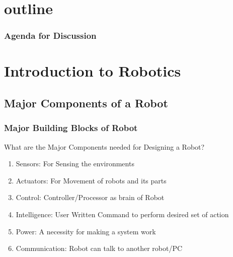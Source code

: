 \documentclass[10pt,red]{beamer}
\title
[
	Firebird LPC2148 Robotics Research Platform	%
	\hspace{0.5cm}
	\insertframenumber/\inserttotalframenumber
]
{
	Introduction to Firebird-V \\ Robotics Research Platform
}
\author
[
	www.e-yantra.org
]
{
	e-Yantra Team \\[20pt]
  Embedded Real-Time Systems Lab\\
  Indian Institute of Technology-Bombay \\
}
\date
{
IIT Bombay \\ 29 June 2015
}
\begin{document}
  

\begin{frame}
   \titlepage
\end{frame}

\section*{outline}
\begin{frame}[shrink = 8]
	\frametitle{Agenda for Discussion}
	\tableofcontents
\end{frame}
 
\section{Introduction to Robotics}
\subsection{Major Components of a Robot}
\begin{frame}
	\frametitle{Major Building Blocks of Robot} 
	What are the Major Components needed for Designing a Robot? \pause \\[5pt]
	\begin{enumerate}
	\item <+-|alert@+> Sensors: For Sensing the environments \\[5pt]
	\item <+-|alert@+> Actuators: For Movement of robots and its parts \\[5pt]
	\item <+-|alert@+> Control: Controller/Processor as brain of Robot \\[5pt]
	\item <+-|alert@+> Intelligence: User Written Command to perform desired set of action \\[5pt]    
	\item <+-|alert@+> Power: A necessity for making a system work \\[5pt]
	\item <+-|alert@+> Communication: Robot can talk to another robot/PC \\[5pt]
	\end{enumerate}
\end{frame}

\end{document}
